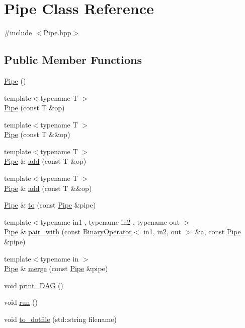 \hypertarget{class_pipe}{\section{\-Pipe \-Class \-Reference}
\label{class_pipe}
}


{\ttfamily \#include $<$\-Pipe.\-hpp$>$}

\subsection*{\-Public \-Member \-Functions}
\begin{DoxyCompactItemize}
\item 
\hyperlink{class_pipe_a91ddad07e89d5585b1cf27fa7860e201}{\-Pipe} ()
\item 
{\footnotesize template$<$typename T $>$ }\\\hyperlink{class_pipe_a2112ea3ec975e32d471195d7d37dced9}{\-Pipe} (const \-T \&op)
\item 
{\footnotesize template$<$typename T $>$ }\\\hyperlink{class_pipe_ad634a48b656601f80db6fa413c47b035}{\-Pipe} (const \-T \&\&op)
\item 
{\footnotesize template$<$typename T $>$ }\\\hyperlink{class_pipe}{\-Pipe} \& \hyperlink{class_pipe_aa0577b9eaa033a89b6a76353764eed39}{add} (const \-T \&op)
\item 
{\footnotesize template$<$typename T $>$ }\\\hyperlink{class_pipe}{\-Pipe} \& \hyperlink{class_pipe_af0843b7b6b6c33606fce7a995450678a}{add} (const \-T \&\&op)
\item 
\hyperlink{class_pipe}{\-Pipe} \& \hyperlink{class_pipe_a1772082ed12c8b1df452a40439738138}{to} (const \hyperlink{class_pipe}{\-Pipe} \&pipe)
\item 
{\footnotesize template$<$typename in1 , typename in2 , typename out $>$ }\\\hyperlink{class_pipe}{\-Pipe} \& \hyperlink{class_pipe_a5ddf06055414d4ad0b511596dbf3a390}{pair\-\_\-with} (const \hyperlink{class_binary_operator}{\-Binary\-Operator}$<$ in1, in2, out $>$ \&a, const \hyperlink{class_pipe}{\-Pipe} \&pipe)
\item 
{\footnotesize template$<$typename in $>$ }\\\hyperlink{class_pipe}{\-Pipe} \& \hyperlink{class_pipe_a7906479c4efc825a0c222f7569842847}{merge} (const \hyperlink{class_pipe}{\-Pipe} \&pipe)
\item 
void \hyperlink{class_pipe_a288d5b72778f836c7fbca280bf858976}{print\-\_\-\-D\-A\-G} ()
\item 
void \hyperlink{class_pipe_a6ecb3df1580730102c3e925875962bfd}{run} ()
\item 
void \hyperlink{class_pipe_a305c4d6db780c5e2d46a89f756d9aadf}{to\-\_\-dotfile} (std\-::string filename)
\end{DoxyCompactItemize}



